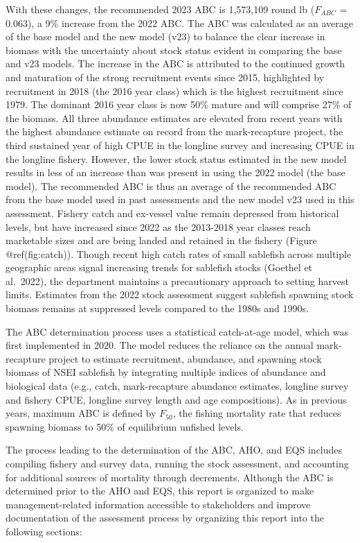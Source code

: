 \documentclass[
]{article}
\begin{document}
With these changes, the recommended 2023 ABC is 1,573,109 round lb
(\(F_{ABC}\) = 0.063), a 9\% increase from the 2022 ABC. The ABC was
calculated as an average of the base model and the new model (v23) to
balance the clear increase in biomass with the uncertainty about stock
status evident in comparing the base and v23 models. The increase in the
ABC is attributed to the continued growth and maturation of the strong
recruitment events since 2015, highlighted by recruitment in 2018 (the
2016 year class) which is the highest recruitment since 1979. The
dominant 2016 year class is now 50\% mature and will comprise 27\% of
the biomass. All three abundance estimates are elevated from recent
years with the highest abundance estimate on record from the
mark-recapture project, the third sustained year of high CPUE in the
longline survey and increasing CPUE in the longline fishery. However,
the lower stock status estimated in the new model results in less of an
increase than was present in using the 2022 model (the base model). The
recommended ABC is thus an average of the recommended ABC from the base
model used in past assessments and the new model v23 used in this
assessment. Fishery catch and ex-vessel value remain depressed from
historical levels, but have increased since 2022 as the 2013-2018 year
classes reach marketable sizes and are being landed and retained in the
fishery (Figure @ref(fig:catch)). Though recent high catch rates of
small sablefish across multiple geographic areas signal increasing
trends for sablefish stocks (Goethel et al.~2022), the department
maintains a precautionary approach to setting harvest limits. Estimates
from the 2022 stock assessment suggest sablefish spawning stock biomass
remains at suppressed levels compared to the 1980s and 1990s.

The ABC determination process uses a statistical catch-at-age model,
which was first implemented in 2020. The model reduces the reliance on
the annual mark-recapture project to estimate recruitment, abundance,
and spawning stock biomass of NSEI sablefish by integrating multiple
indices of abundance and biological data (e.g., catch, mark-recapture
abundance estimates, longline survey and fishery CPUE, longline survey
length and age compositions). As in previous years, maximum ABC is
defined by \(F_{50}\), the fishing mortality rate that reduces spawning
biomass to 50\% of equilibrium unfished levels.

The process leading to the determination of the ABC, AHO, and EQS
includes compiling fishery and survey data, running the stock
assessment, and accounting for additional sources of mortality through
decrements. Although the ABC is determined prior to the AHO and EQS,
this report is organized to make management-related information
accessible to stakeholders and improve documentation of the assessment
process by organizing this report into the following sections:
\end{document}

